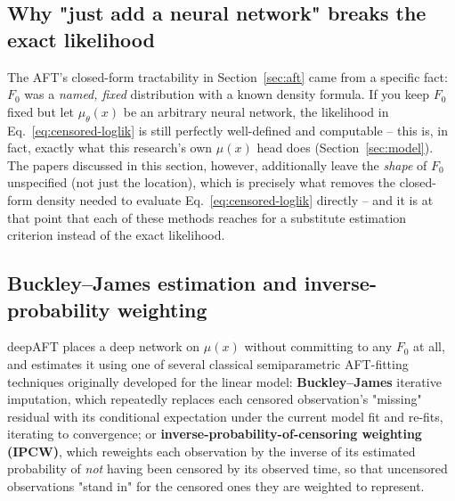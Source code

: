 \documentclass[11pt]{article}
\begin{document}
\subsection{Why "just add a neural network" breaks the exact likelihood}
The AFT's closed-form tractability in Section~\ref{sec:aft} came from a
specific fact: $F_0$ was a \emph{named, fixed} distribution with a known
density formula. If you keep $F_0$ fixed but let $\mu_\theta(x)$ be an
arbitrary neural network, the likelihood in
Eq.~\eqref{eq:censored-loglik} is still perfectly well-defined and
computable -- this is, in fact, exactly what this research's own
$\mu(x)$ head does (Section~\ref{sec:model}). The papers discussed in
this section, however, additionally leave the \emph{shape} of $F_0$
unspecified (not just the location), which is precisely what removes the
closed-form density needed to evaluate Eq.~\eqref{eq:censored-loglik}
directly -- and it is at that point that each of these methods reaches
for a substitute estimation criterion instead of the exact likelihood.

\subsection{Buckley--James estimation and inverse-probability weighting}
deepAFT \citep{norman2024deepaft} places a deep network on $\mu(x)$
without committing to any $F_0$ at all, and estimates it using one of
several classical semiparametric AFT-fitting techniques originally
developed for the linear model: \textbf{Buckley--James} iterative
imputation, which repeatedly replaces each censored observation's
"missing" residual with its conditional expectation under the current
model fit and re-fits, iterating to convergence; or
\textbf{inverse-probability-of-censoring weighting (IPCW)}, which
reweights each observation by the inverse of its estimated probability of
\emph{not} having been censored by its observed time, so that
uncensored observations "stand in" for the censored ones they are
weighted to represent.
\end{document}
